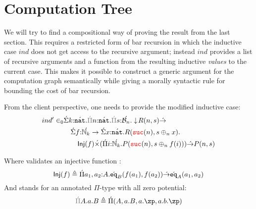 \section{Computation Tree}

We will try to find a compositional way of proving the result from the last section. This requires
a restricted form of bar recursion in which the inductive case $ind$ does not get access to the 
recursive argument; instead $ind$ provides a list of recursive arguments and a function 
from the resulting inductive \emph{values} to the current case. This makes it possible to 
construct a generic argument for the computation graph semantically while giving a 
morally syntactic rule for bounding the cost of bar recursion.

From the client perspective, one needs to provide the modified inductive case:
\begin{align*}
  \isVal{ind'}{&\sigmatyc{\isOf{k}{\lift{\nat}}}{
    \pityzc{\isOf{n}{\lift{\nat}}}{\pityzc{\isOf{s}{\lift{\nseq{n}}}}
      {\squash{R(n,s)} \tolr \\
        &\quad\sigmatyc{\isOf{f}{\lift{\N_k} \to 
        \sigmatyc{\isOf{x}{\lift{\nat}}}{R(\suc{n},s \oplus_n x)}}}{\\
      &\quad\quad\Inj{f} \lift{\times} 
        (\pityc{\isOf{i}{\lift{\N_k}}}{P(\suc{n}, s \oplus_n f(i))}}) \tolr P(n,s)}}}}
\end{align*}

Where  validates an injective function :
\[
  \mathsf{Inj}(f) \triangleq {\acute{\Pi}} a_1,a_2 {:} A.{\acute{\mathtt{eq}}}_{B}(f(a_1), \allowbreak f(a_2)) {\acute{\to}} {\acute{\mathtt{eq}}}_{A}(a_1, \allowbreak a_2)
\]
And  stands for an annotated $\Pi$-type with all zero potential:
\[
\pityzc{A}{a.B} \triangleq \arrabtc{A}{a.B}{a.\zp,a.b.\zp}
\]

